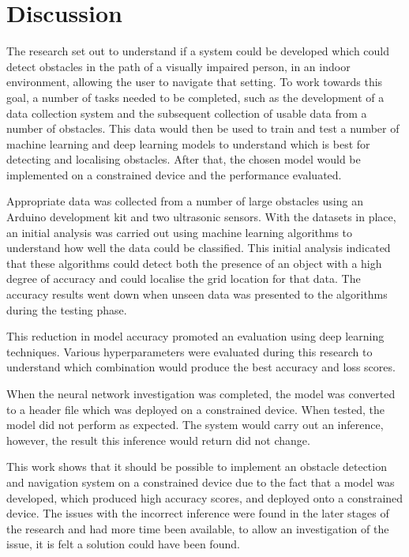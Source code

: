 \documentclass{svproc}
\begin{document}
\section{Discussion}
The research set out to understand if a system could be developed which could detect obstacles in the path of a visually impaired person, 
in an indoor environment, allowing the user to navigate that setting. To work towards this goal, a number of tasks needed to be completed, 
such as the development of a data collection system and the subsequent collection of usable data from a number of obstacles. This data would 
then be used to train and test a number of machine learning and deep learning models to understand which is best for detecting and localising 
obstacles. After that, the chosen model would be implemented on a constrained device and the performance evaluated. 

Appropriate data was collected from a number of large obstacles using an Arduino development kit and two ultrasonic sensors. With the datasets 
in place, an initial analysis was carried out using machine learning algorithms to understand how well the data could be classified. This initial 
analysis indicated that these algorithms could detect both the presence of an object with a high degree of accuracy and could localise the grid 
location for that data. The accuracy results went down when unseen data was presented to the algorithms during the testing phase. 

This reduction in model accuracy promoted an evaluation using deep learning techniques. Various hyperparameters were evaluated during this 
research to understand which combination would produce the best accuracy and loss scores. 

When the neural network investigation was completed, the model was converted to a header file which was deployed on a constrained device. 
When tested, the model did not perform as expected. The system would carry out an inference, however, the result this inference would return did not change.

This work shows that it should be possible to implement an obstacle detection and navigation system on a constrained device due to the fact 
that a model was developed, which produced high accuracy scores, and deployed onto a constrained device. The issues with the incorrect inference 
were found in the later stages of the research and had more time been available, to allow an investigation of the issue, it is felt a solution 
could have been found.
\end{document}

